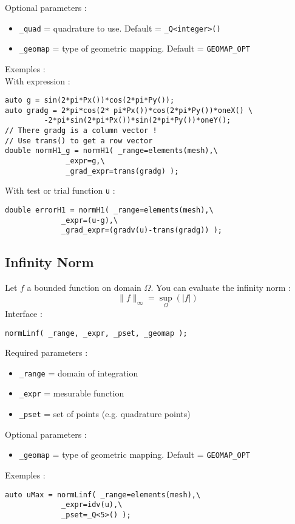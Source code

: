 \noindent Optional parameters :
\begin{itemize}
 \item \lstinline!_quad! = quadrature to use. Default = \lstinline!_Q<integer>()!
 \item \lstinline!_geomap! = type of geometric mapping. Default = \lstinline!GEOMAP_OPT!
\end{itemize}

\noindent Exemples :\\
With expression :
\begin{lstlisting}
auto g = sin(2*pi*Px())*cos(2*pi*Py());
auto gradg = 2*pi*cos(2* pi*Px())*cos(2*pi*Py())*oneX() \
	     -2*pi*sin(2*pi*Px())*sin(2*pi*Py())*oneY();
// There gradg is a column vector !
// Use trans() to get a row vector
double normH1_g = normH1( _range=elements(mesh),\
			  _expr=g,\
			  _grad_expr=trans(gradg) );
\end{lstlisting}
With test or trial function \lstinline!u! :
\begin{lstlisting} 
double errorH1 = normH1( _range=elements(mesh),\
			 _expr=(u-g),\ 
			 _grad_expr=(gradv(u)-trans(gradg)) );
\end{lstlisting}


\subsection{Infinity Norm}
Let $f$ a bounded function on domain $\Omega$. You can evaluate the infinity norm :
$$\parallel f \parallel_\infty=\sup_\Omega(|f|)$$
\label{keywords:normLinf}
\noindent Interface :
\begin{lstlisting}
normLinf( _range, _expr, _pset, _geomap );
\end{lstlisting}

\noindent Required parameters :
\begin{itemize}
 \item \lstinline!_range! = domain of integration
 \item \lstinline!_expr! = mesurable function
 \item \lstinline!_pset! = set of points (e.g. quadrature points)
\end{itemize}

\noindent Optional parameters :
\begin{itemize}
 \item \lstinline!_geomap! = type of geometric mapping. Default = \lstinline!GEOMAP_OPT!
\end{itemize}

\noindent Exemples :
\begin{lstlisting}
auto uMax = normLinf( _range=elements(mesh),\
		     _expr=idv(u),\
		     _pset=_Q<5>() );
\end{lstlisting}








